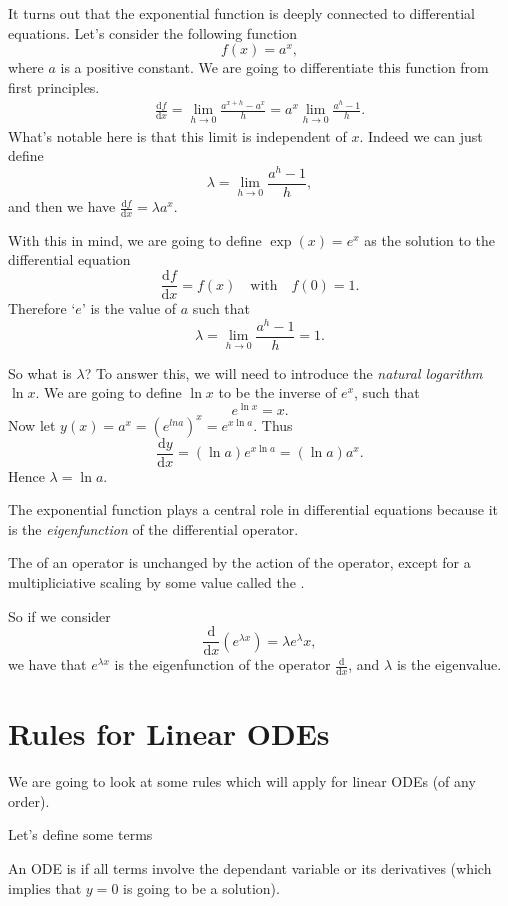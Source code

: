 \documentclass[a4paper]{scrreprt}
\newcommand{\dd}{\mathrm{d}}
\begin{document}
It turns out that the exponential function is deeply connected to differential equations. Let's consider the following function
$$
f(x) = a^x,
$$
where $a$ is a positive constant.
We are going to differentiate this function from first principles. 
\begin{align*}
	\frac{\dd f}{\dd x} = \lim_{h \to 0} \frac{a^{x + h} - a^x}{h} = a^{x} \lim_{h \to 0} \frac{a^h - 1}{h}.
\end{align*}
What's notable here is that this limit is independent of $x$. Indeed we can just define
$$
\lambda = \lim_{h \to 0} \frac{a^h - 1}{h},
$$
and then we have $\displaystyle \frac{\dd f}{\dd x} = \lambda a^x$.

With this in mind, we are going to define $\exp(x) = e^x$ as the solution to the differential equation
$$
\frac{\dd f}{\dd x} = f(x) \quad \text{with} \quad f(0) = 1.
$$
Therefore `$e$' is the value of $a$ such that 
$$
\lambda = \lim_{h \to 0} \frac{a^h - 1}{h} = 1.
$$

So what is $\lambda$? To answer this, we will need to introduce the \emph{natural logarithm} $\ln x$. We are going to define $\ln x$ to be the inverse of $e^x$, such that
$$
e^{\ln x} = x.
$$
Now let $y(x) = a^{x} = \left(e^{ln a}\right)^x = e^{x \ln a}$. Thus
$$
\frac{\dd y}{\dd x} = (\ln a) e^{x \ln a} =(\ln a) a^x.
$$
Hence $\lambda = \ln a$.

The exponential function plays a central role in differential equations because it is the \emph{
eigenfunction} of the differential operator.

\begin{definition}[Eigenfunction]
The  of an operator is unchanged by the action of the operator, except for a multipliciative scaling by some value called the .
\end{definition}

So if we consider 
$$
\frac{\dd}{\dd x} \left(e^{\lambda x}\right) = \lambda e^{\lambda} x,
$$
we have that $e^{\lambda x}$ is the eigenfunction of the operator $\frac{\dd}{\dd x}$, and $\lambda$ is the eigenvalue.


\section{Rules for Linear ODEs}

We are going to look at some rules which will apply for linear ODEs (of any order).

Let's define some terms
\begin{definition}[Homogeneous]
	An ODE is  if all terms involve the dependant variable or its derivatives (which implies that $y = 0$ is going to be a solution).
\end{definition}
\end{document}
